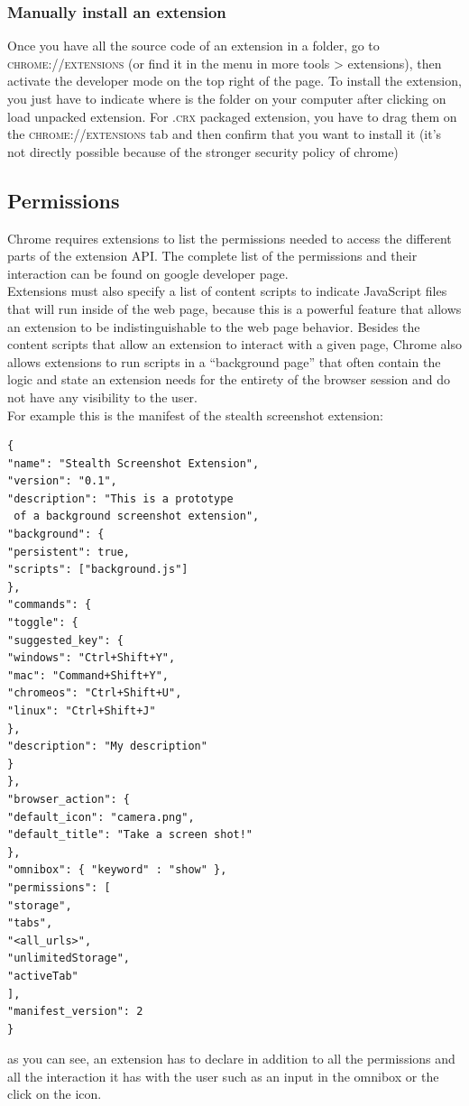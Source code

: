 \documentclass[12pt]{article}
\begin{document}
\begin{multicols}{2}
\subsubsection*{Manually install an extension}
	Once you have all the source code of an extension in a folder, go to  \textsc{chrome://extensions} (or find it in the menu in more tools > extensions), then activate the developer mode on the top right of the page. To install the extension, you just have to indicate where is the folder on your computer after clicking on load unpacked extension. For \textsc{.crx} packaged extension, you have to drag them on the \textsc{chrome://extensions} tab and then confirm that you want to install it (it's not directly possible because of the stronger security policy of chrome)
\subsection*{Permissions}
Chrome requires extensions to list the
permissions needed to access the different parts of the
extension API. The complete list of the permissions and their interaction can be found on google developer page\cite{Google}.\\
Extensions must also specify a list of content scripts to indicate
JavaScript files that will run inside of the web page, because this is a powerful feature that allows an extension to be indistinguishable to the web page behavior. Besides the content scripts that
allow an extension to interact with a given page,
Chrome also allows extensions to run scripts in a
“background page” that often contain the
logic and state an extension needs for the entirety
of the browser session and do not have any visibility
to the user.\\
For example this is the manifest of the stealth screenshot extension:
\begin{lstlisting}
{
"name": "Stealth Screenshot Extension",
"version": "0.1",
"description": "This is a prototype
 of a background screenshot extension",
"background": {
"persistent": true,
"scripts": ["background.js"]
},
"commands": {
"toggle": {
"suggested_key": {
"windows": "Ctrl+Shift+Y",
"mac": "Command+Shift+Y",
"chromeos": "Ctrl+Shift+U",
"linux": "Ctrl+Shift+J"
},
"description": "My description"
}
},
"browser_action": {
"default_icon": "camera.png",
"default_title": "Take a screen shot!"
},
"omnibox": { "keyword" : "show" },
"permissions": [
"storage",
"tabs",
"<all_urls>",
"unlimitedStorage",
"activeTab"
],
"manifest_version": 2
}
\end{lstlisting}
as you can see, an extension has to declare in addition to all the permissions and all the interaction it has with the user such as an input in the omnibox or the click on the icon.

\end{multicols}
\end{document}
